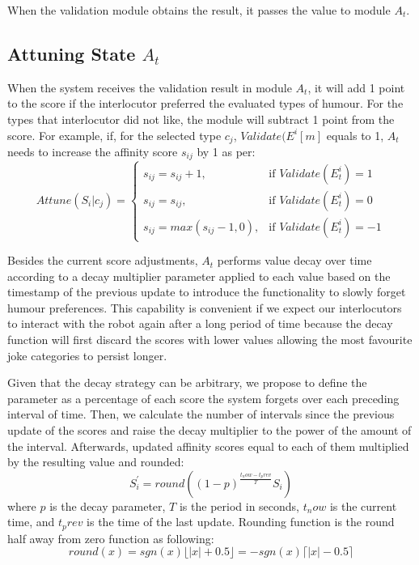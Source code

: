 When the validation module obtains the result, it passes the value to module \( A_t\).

\subsection{Attuning State \texorpdfstring{\( A_t\)}{At}}\label{subs:At}

When the system receives the validation result in module \( A_t\), it will add 1 point to the score if the interlocutor preferred the evaluated types of humour. For the types that interlocutor did not like, the module will subtract 1 point from the score. For example, if, for the selected type \( c_j\), \( Validate(E^{i}[m]\) equals to 1, \( A_t\) needs to increase the affinity score \( s_{ij}\) by 1 as per:
$$
Attune(S_i|c_j)=
    \begin{cases}
        s_{ij}=s_{ij}+1, & \text{if $Validate(E_t^{i})=1$} \\
        s_{ij}=s_{ij}, & \text{if $Validate(E_t^{i})=0$} \\
        s_{ij}=max(s_{ij}-1, 0), & \text{if $Validate(E_t^{i})=-1$}
    \end{cases}
$$ \par
Besides the current score adjustments, \( A_t\) performs value decay over time according to a decay multiplier parameter applied to each value based on the timestamp of the previous update to introduce the functionality to slowly forget humour preferences. This capability is convenient if we expect our interlocutors to interact with the robot again after a long period of time because the decay function will first discard the scores with lower values allowing the most favourite joke categories to persist longer.  

Given that the decay strategy can be arbitrary, we propose to define the parameter as a percentage of each score the system forgets over each preceding interval of time. Then, we calculate the number of intervals since the previous update of the scores and raise the decay multiplier to the power of the amount of the interval. Afterwards, updated affinity scores equal to each of them multiplied by the resulting value and rounded:
\[ S_i^{'} = round((1-p)^{\frac{t_now-t_prev}{T}}S_i)\]
where \( p\) is the decay parameter, \( T\) is the period in seconds, \( t_now\) is the current time, and \( t_prev\) is the time of the last update. Rounding function is the round half away from zero function as following:
\[ round(x)=sgn(x)\lfloor|x|+0.5\rfloor=-sgn(x)\lceil|x|-0.5\rceil\] \par

